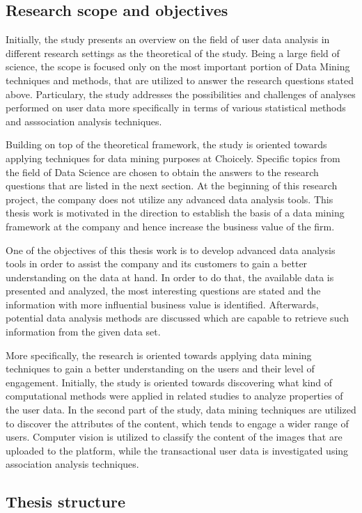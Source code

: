 \subsection{Research scope and objectives}
    Initially, the study presents an overview on the field of user data analysis in different research settings as the theoretical of the study. Being a large field of science, the scope is focused only on the most important portion of Data Mining techniques and methods, that are utilized to answer the research questions stated above. Particulary, the study addresses the possibilities and challenges of analyses performed on user data more specifically in terms of various statistical methods and asssociation analysis techniques.    

    Building on top of the theoretical framework, the study is oriented towards applying techniques for data mining purposes at Choicely. Specific topics from the field of Data Science are chosen to obtain the answers to the research questions that are listed in the next section. At the beginning of this research project, the company does not utilize any advanced data analysis tools. This thesis work is motivated in the direction to establish the basis of a data mining framework at the company and hence increase the business value of the firm.  

    One of the objectives of this thesis work is to develop advanced data analysis tools in order to assist the company and its customers to gain a better understanding on the data at hand. In order to do that, the available data is presented and analyzed, the most interesting questions are stated and the information with more influential business value is identified. Afterwards, potential data analysis methods are discussed which are capable to retrieve such information from the given data set.  

    More specifically, the research is oriented towards applying data mining techniques to gain a better understanding on the users and their level of engagement. Initially, the study is oriented towards discovering what kind of  computational methods were applied in related studies to analyze properties of the user data. In the second part of the study, data mining techniques are utilized to discover the attributes of the content, which tends to engage a wider range of users. Computer vision is utilized to classify the content of the images that are uploaded to the platform, while the transactional user data is investigated using association analysis techniques. %

\subsection{Thesis structure}

